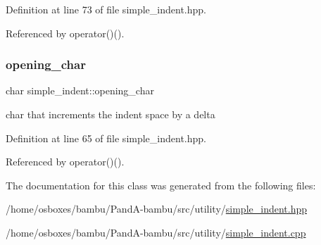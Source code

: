 Definition at line 73 of file simple\+\_\+indent.\+hpp.



Referenced by operator()().

\mbox{\label{classsimple__indent_a47bb56e9b42182e8c35a2ff77e7dcb69}} 
\subsubsection{\texorpdfstring{opening\+\_\+char}{opening\_char}}
{\footnotesize\ttfamily char simple\+\_\+indent\+::opening\+\_\+char\hspace{0.3cm}{\ttfamily [private]}}



char that increments the indent space by a delta 



Definition at line 65 of file simple\+\_\+indent.\+hpp.



Referenced by operator()().



The documentation for this class was generated from the following files\+:\begin{DoxyCompactItemize}
\item 
/home/osboxes/bambu/\+Pand\+A-\/bambu/src/utility/\hyperlink{simple__indent_8hpp}{simple\+\_\+indent.\+hpp}\item 
/home/osboxes/bambu/\+Pand\+A-\/bambu/src/utility/\hyperlink{simple__indent_8cpp}{simple\+\_\+indent.\+cpp}\end{DoxyCompactItemize}
